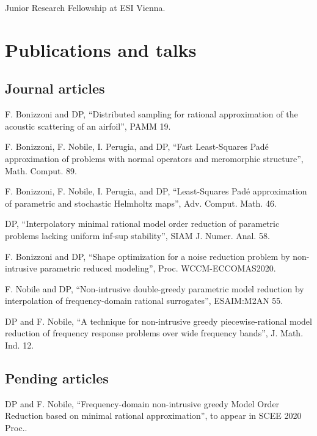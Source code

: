 \documentclass[11pt]{article} %
\begin{document}
Junior Research Fellowship at ESI Vienna.


\section*{Publications and talks}

\subsection*{Journal articles}

\hspace{\parindent}F. Bonizzoni and DP, ``Distributed sampling for rational approximation of the acoustic scattering of an airfoil'', PAMM 19.

F. Bonizzoni, F. Nobile, I. Perugia, and DP, ``Fast Least-Squares Pad\'e approximation of problems with normal operators and meromorphic structure'', Math. Comput. 89.

F. Bonizzoni, F. Nobile, I. Perugia, and DP, ``Least-Squares Pad\'e approximation of parametric and stochastic Helmholtz maps'', Adv. Comput. Math. 46.

\yearsminus DP, ``Interpolatory minimal rational model order reduction of parametric problems lacking uniform inf-sup stability'', SIAM J. Numer. Anal. 58.

F. Bonizzoni and DP, ``Shape optimization for a noise reduction problem by non-intrusive parametric reduced modeling'', Proc. WCCM-ECCOMAS2020.

\yearsminus F. Nobile and DP, ``Non-intrusive double-greedy parametric model reduction by interpolation of frequency-domain rational surrogates'', ESAIM:M2AN 55.

DP and F. Nobile, ``A technique for non-intrusive greedy piecewise-rational model reduction of frequency response problems over wide frequency bands'', J. Math. Ind. 12.

\subsection*{Pending articles}

\hspace{\parindent}DP and F. Nobile, ``Frequency-domain non-intrusive greedy Model Order Reduction based on minimal rational approximation'', to appear in SCEE 2020 Proc..
\end{document}
